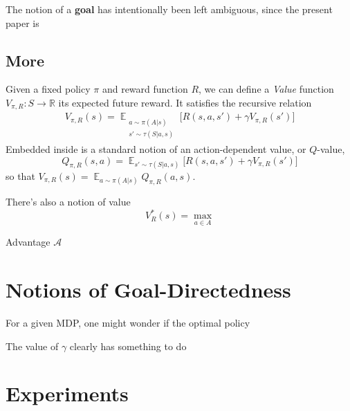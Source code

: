 \documentclass{article}
\DeclareMathOperator*{\argmax}{\arg\max}
\DeclareMathOperator*{\Ex}{\mathbb E}
\begin{document}
    The notion of a \textbf{goal} has intentionally been left ambiguous, since the present paper is 
    
    
    
        
    
        
    
    \subsection{More }
    Given a fixed policy $\pi$ and reward function $R$, we can define a \emph{Value} function $V_{\pi, R} : S \to \mathbb R$ its expected future reward.
    It satisfies the recursive relation
    \begin{align*}
        V_{\pi,R}(s) = \Ex_{ \substack{ a \sim \pi(A|s) \\ s' \sim \tau(S|a,s) }}
            \Big[ R(s,a,s') + \gamma V_{\pi, R}(s') \Big]
    \end{align*}
    Embedded inside is a standard notion of an action-dependent value, or $Q$-value,
    \[
        Q_{\pi,R}(s,a) = \Ex_{ s' \sim \tau(S|a,s) } \Big[ R(s,a,s') + \gamma V_{\pi, R}(s') \Big]
    \]
    so that $V_{\pi,R}(s) = \Ex_{a \sim \pi(A|s)} Q_{\pi,R}(a,s)$. 

    There's also a notion of value
    \[
        V^*_R(s)  = \max_{a \in A}
    \]


    Advantage $\mathcal A$
    
    
    \section{Notions of Goal-Directedness}

    
    
    For a given MDP, one might wonder if the optimal policy 

    The value of $\gamma$ clearly has something to do 
    
    
    
    
    
    

    \section{Experiments}
\end{document}
